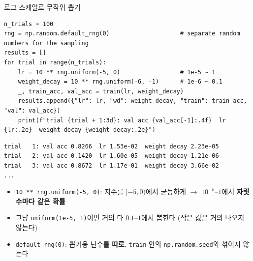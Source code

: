 \documentclass[aspectratio=169,11pt]{beamer}
\newcommand{\codesmall}{\ttfamily\fontsize{7.4}{8.3}\selectfont}
\newcommand{\code}[1]{\texttt{#1}}
\begin{document}
\begin{frame}{로그 스케일로 무작위 뽑기}
\small
\begin{lstlisting}
n_trials = 100
rng = np.random.default_rng(0)                    # separate random numbers for the sampling
results = []
for trial in range(n_trials):
    lr = 10 ** rng.uniform(-5, 0)                 # 1e-5 ~ 1
    weight_decay = 10 ** rng.uniform(-6, -1)      # 1e-6 ~ 0.1
    _, train_acc, val_acc = train(lr, weight_decay)
    results.append({"lr": lr, "wd": weight_decay, "train": train_acc, "val": val_acc})
    print(f"trial {trial + 1:3d}: val acc {val_acc[-1]:.4f}  lr {lr:.2e}  weight decay {weight_decay:.2e}")
\end{lstlisting}
\begin{lstlisting}[style=outstyle,basicstyle=\codesmall]
trial   1: val acc 0.8266  lr 1.53e-02  weight decay 2.23e-05
trial   2: val acc 0.1420  lr 1.60e-05  weight decay 1.21e-06
trial   3: val acc 0.8672  lr 1.17e-01  weight decay 3.66e-02
...
\end{lstlisting}
\small
\begin{itemize}
\item \code{10 ** rng.uniform(-5, 0)}: 지수를 $[-5,0)$에서 균등하게 $\to$ $10^{-5}$--$1$에서 \textbf{자릿수마다 같은 확률}
\item 그냥 \code{uniform(1e-5, 1)}이면 거의 다 $0.1$--$1$에서 뽑힌다 (작은 값은 거의 나오지 않는다)
\item \code{default\_rng(0)}: 뽑기용 난수를 \textbf{따로}. \code{train} 안의 \code{np.random.seed}와 섞이지 않는다
\end{itemize}
\end{frame}
\end{document}
